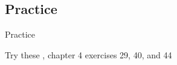 \documentclass{beamer}
\newcommand{\subonefour}{Practice}
\begin{document}
    \subsection{\subonefour}
      \begin{frame}{\subonefour}
        \begin{block}{Try these}
          \textcite{dawson_language_2016}, chapter 4 exercises 29, 40, and 44
        \end{block}
      \end{frame}
\end{document}
